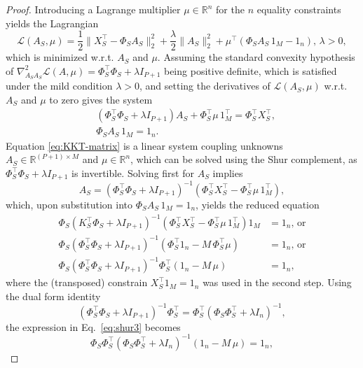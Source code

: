 \documentclass[10pt,a4paper]{amsart}
\begin{document}
\begin{proof}
Introducing a Lagrange multiplier $\mu\in\mathbb{R}^n$ for the $n$ equality constraints yields the Lagrangian
\begin{equation}
\mathcal{L}(A_S,\mu) = \frac{1}{2}\|X^{\top}_S-\Phi_S A_S\|^2_2 + \frac{\lambda}{2}\|A_S\|^2_2 + \mu^\top (\Phi_S A_S\,1_M -1_n), \, \lambda>0,
\end{equation}
which is minimized w.r.t. $A_S$ and $\mu$. Assuming the standard convexity hypothesis of $\nabla^2_{A_S A_S}\mathcal{L}(A,\mu)=\Phi_S^\top \Phi_S + \lambda I_{P+1}$ being positive definite, which is satisfied under the mild condition $\lambda>0$, and setting the derivatives of $\mathcal{L}(A_S,\mu)$ w.r.t. $A_S$ and $\mu$ to zero gives the system  
\begin{equation}
\label{eq:KKT-matrix}
\begin{aligned}
&(\Phi_S^\top \Phi_S + \lambda I_{P+1}) A_S + \Phi_S^\top \mu\,1_M^\top = \Phi_S^\top X^{\top}_S,\\
& \Phi_S A_S\,1_M =1_n.
\end{aligned}
\end{equation}
Equation \eqref{eq:KKT-matrix} is a linear system coupling unknowns $A_S\in\mathbb{R}^{(P+1)\times M}$ and $\mu\in\mathbb{R}^n$, which can be solved using the Shur complement, as $\Phi_S^\top \Phi_S + \lambda I_{P+1}$ is invertible. Solving first for $A_S$ implies
\begin{equation}
    A_S=(\Phi_S^\top \Phi_S + \lambda I_{P+1})^{-1}(\Phi_S^\top X^{\top}_S-\Phi_S^\top \mu\,1_M^\top),
    \label{eq:ShurA}
\end{equation}
which, upon substitution into $\Phi_S A_S\,1_M =1_n$, yields the reduced equation
\begin{align}
    \Phi_S(K_S^\top \Phi_S + \lambda I_{P+1})^{-1}(\Phi_S^\top X^{\top}_S-\Phi_S^\top \mu\,1_M^\top)1_M & = 1_n, \, \mbox{or} \nonumber \\
    \Phi_S(\Phi_S^\top \Phi_S + \lambda I_{P+1})^{-1}(\Phi_S^\top 1_n-M\,\Phi_S^\top \mu) & = 1_n, \, \mbox{or} \nonumber \\
    \Phi_S(\Phi_S^\top \Phi_S + \lambda I_{P+1})^{-1}\Phi_S^\top( 1_n-M\,\mu) & =1_n,
   \label{eq:shur3}
\end{align}
where the (transposed) constrain $X_S^\top 1_M=1_n$ was used in the second step. Using the dual form identity
\begin{equation}
    (\Phi_S^\top \Phi_S + \lambda I_{P+1})^{-1}\Phi_S^\top=\Phi_S^\top(\Phi_S \Phi_S^\top + \lambda I_n)^{-1},
    \label{eq:dual_identity}
\end{equation}
the expression in Eq.~\eqref{eq:shur3} becomes
\begin{equation}
\Phi_S\Phi_S^\top(\Phi_S \Phi_S^\top + \lambda I_n)^{-1}( 1_n-M\,\mu) =1_n,
   \label{eq:shur4}
\end{equation}


\end{proof}
\end{document}
